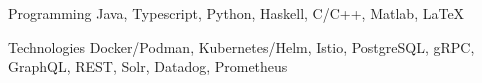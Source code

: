 

\begin{cvskills}

  \cvskill
    {Programming} %
    {Java, Typescript, Python, Haskell, C/C++, Matlab, LaTeX} %

  \cvskill
    {Technologies} %
    {Docker/Podman, Kubernetes/Helm, Istio, PostgreSQL, gRPC, GraphQL, REST, Solr, Datadog, Prometheus} %

\end{cvskills}